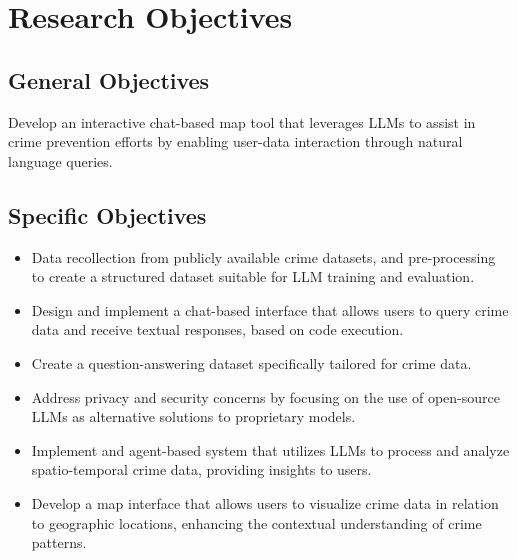 \section{Research Objectives} %

\subsection{General Objectives}
Develop an interactive chat-based map tool that leverages LLMs to assist in crime prevention efforts by enabling user-data interaction through natural language queries.

\subsection{Specific Objectives}
\begin{itemize}
    \item Data recollection from publicly available crime datasets, and pre-processing to create a structured dataset suitable for LLM training and evaluation.
    \item Design and implement a chat-based interface that allows users to query crime data and receive textual responses, based on code execution.
    \item Create a question-answering dataset specifically tailored for crime data.
    \item Address privacy and security concerns by focusing on the use of open-source LLMs as alternative solutions to proprietary models.
    \item Implement and agent-based system that utilizes LLMs to process and analyze spatio-temporal crime data, providing insights to users.
    \item Develop a map interface that allows users to visualize crime data in relation to geographic locations, enhancing the contextual understanding of crime patterns.
\end{itemize}

